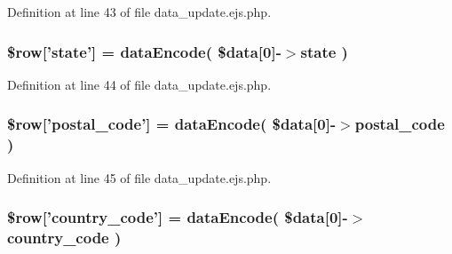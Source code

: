 \-Definition at line 43 of file data\-\_\-update.\-ejs.\-php.

\hypertarget{patientfile_2immnunization_2data__update_8ejs_8php_a652ce4ee989023692939900810b2a70a}{
\subsubsection[{\$row}]{\setlength{\rightskip}{0pt plus 5cm}\$row\mbox{[}'state'\mbox{]} = {\bf data\-Encode}( \$data\mbox{[}0\mbox{]}-\/$>$state )}}\label{patientfile_2immnunization_2data__update_8ejs_8php_a652ce4ee989023692939900810b2a70a}


\-Definition at line 44 of file data\-\_\-update.\-ejs.\-php.

\hypertarget{patientfile_2immnunization_2data__update_8ejs_8php_ad7806756ac25ee8772f6b02f00d601b7}{
\subsubsection[{\$row}]{\setlength{\rightskip}{0pt plus 5cm}\$row\mbox{[}'postal\-\_\-code'\mbox{]} = {\bf data\-Encode}( \$data\mbox{[}0\mbox{]}-\/$>$postal\-\_\-code )}}\label{patientfile_2immnunization_2data__update_8ejs_8php_ad7806756ac25ee8772f6b02f00d601b7}


\-Definition at line 45 of file data\-\_\-update.\-ejs.\-php.

\hypertarget{patientfile_2immnunization_2data__update_8ejs_8php_a7c5128fc922226763e03d46ff4b7a35e}{
\subsubsection[{\$row}]{\setlength{\rightskip}{0pt plus 5cm}\$row\mbox{[}'country\-\_\-code'\mbox{]} = {\bf data\-Encode}( \$data\mbox{[}0\mbox{]}-\/$>$country\-\_\-code )}}\label{patientfile_2immnunization_2data__update_8ejs_8php_a7c5128fc922226763e03d46ff4b7a35e}


